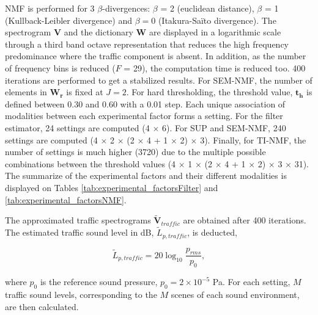 \documentclass[review,5p,twocolumn,sort&compress,times]{elsarticle}
\begin{document}
NMF is performed for 3 $\beta$-divergences: $\beta$ = 2 (euclidean distance), $\beta$ = 1 (Kullback-Leibler divergence) and $\beta = 0$ (Itakura-Sa\"ito divergence). The spectrogram $\mathbf{V}$ and the dictionary $\mathbf{W}$ are displayed in a logarithmic scale through a third band octave representation that reduces the high frequency predominance where the traffic component is absent. In addition, as the number of frequency bins is reduced ($F$ = 29), the computation time is reduced too. 400 iterations are performed to get a stabilized results. For SEM-NMF, the number of elements in $\mathbf{W_r}$ is fixed at $J = 2$. For hard thresholding, the threshold value, $\mathbf{t_h}$ is defined between 0.30 and 0.60 with a 0.01 step.
Each unique association of modalities between each experimental factor forms a setting. For the filter estimator, 24 settings are computed (4 $\times$ 6). For SUP and SEM-NMF, 240 settings are computed (4 $\times$ 2 $\times$ (2 $\times$ 4 + 1 $\times$ 2) $\times$ 3). Finally, for TI-NMF, the number of settings is much higher (3720) due to the multiple possible combinations between the threshold values (4 $\times$ 1 $\times$ (2 $\times$ 4 + 1 $\times$ 2) $\times$ 3 $\times$ 31).
The summarize of the experimental factors and their different modalities is displayed on Tables \ref{tab:experimental_factorsFilter} and \ref{tab:experimental_factorsNMF}.

The approximated traffic spectrograms $\mathbf{\tilde{V}}_{traffic}$ are obtained after 400 iterations. The estimated traffic sound level in dB, $\tilde{L}_{p, traffic}$, is deducted,

\begin{equation}
\tilde{L}_{p, traffic} = 20\log_{10}\frac{p_{rms}}{p_0},
\end{equation}

where $p_0$ is the reference sound pressure, $p_0 = 2\times 10^{-5}$ Pa. For each setting, $M$ traffic sound levels, corresponding to the $M$ scenes of each sound environment, are then calculated.
\end{document}
